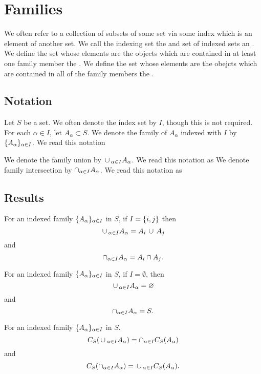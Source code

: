\section{Families}

We often refer to a collection of subsets of some set via some index which is an element of another set.
We call the indexing set the  and set of indexed sets an .
We define the set whose elements are the objects which are contained in at least one family member the .
We define the set whose elements are the obejcts which are contained in all of the family members the .

\subsection{Notation}

Let $S$ be a set.
We often denote the index set by $I$, though this is not required.
For each $\alpha \in I$, let $A_{\alpha} \subset S$.
We denote the family of $A_{\alpha}$ indexed with $I$ by $\{A_{\alpha}\}_{\alpha \in I}$.
We read this notation 

We denote the family union by $\,\cup\,_{\alpha \in I} A_{\alpha}$.
We read this notation as 
We denote family intersection by $\cap_{\alpha \in I} A_{\alpha}$.
We read this notation as 

\subsection{Results}

\begin{prop}
  For an indexed family $\{A_{\alpha}\}_{\alpha \in I}$ in $S$, if $I = \{i, j\}$ then
  \[
    \,\cup\,_{\alpha \in I} A_{\alpha} = A_i \,\cup\, A_j
  \]
  and
  \[
    \cap_{\alpha \in I} A_{\alpha} = A_i \cap A_j.
  \]
\end{prop}

\begin{prop}
  For an indexed family $\{A_{\alpha}\}_{\alpha \in I}$ in $S$, if $I = \emptyset$, then
  \[
    \,\cup\,_{\alpha \in I} A_{\alpha} = \varnothing
  \]
  and
  \[
    \cap_{\alpha \in I} A_{\alpha} = S.
  \]
\end{prop}

\begin{prop}
  For an indexed family $\{A_{\alpha}\}_{\alpha \in I}$ in $S$.
  \[
    C_S(\,\cup\,_{\alpha \in I} A_{\alpha}) = \cap_{\alpha \in I} C_S(A_{\alpha})
  \]
  and
  \[
    C_S(\cap_{\alpha \in I} A_{\alpha}) = \,\cup\,_{\alpha \in I} C_S(A_{\alpha}).
  \]
\end{prop}

